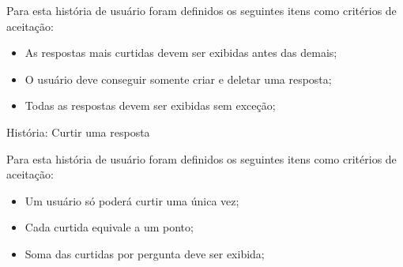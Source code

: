 Para esta história de usuário foram definidos os seguintes itens como critérios de aceitação:

\begin{itemize}
\item As respostas mais curtidas devem ser exibidas antes das demais;
\item O usuário deve conseguir somente criar e deletar uma resposta;
\item Todas as respostas devem ser exibidas sem exceção;
\end{itemize}

\def\arraystretch{2}
\begin{quadro}[htb]
\centering
\ABNTEXfontereduzida
\caption[História: Curtir uma resposta]{História: Curtir uma resposta}
\end{quadro}
\FloatBarrier 

Para esta história de usuário foram definidos os seguintes itens como critérios de aceitação:

\begin{itemize}
\item Um usuário só poderá curtir uma única vez;
\item Cada curtida equivale a um ponto;
\item Soma das curtidas por pergunta deve ser exibida;
\end{itemize}

